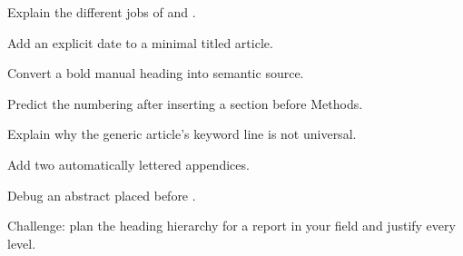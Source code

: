 \chapterexercisestitle
\begin{chapterexercises}
  \item Explain the different jobs of  and .
  \item Add an explicit date to a minimal titled article.
  \item Convert a bold manual heading into semantic source.
  \item Predict the numbering after inserting a section before Methods.
  \item Explain why the generic article's keyword line is not universal.
  \item Add two automatically lettered appendices.
  \item Debug an abstract placed before .
  \item Challenge: plan the heading hierarchy for a report in your field and
        justify every level.
\end{chapterexercises}
